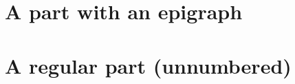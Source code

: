 \documentclass[11pt, a4paper, makeidx]{memoir}
\newcommand{\epipart}[3]{
\let\oldafterpartskip\afterpartskip
\renewcommand{\afterpartskip}{%
\vspace{1em}
\epigraph{#2}{#3}
\vfill
}
\part*{#1}
\let\afterpartskip\oldafterpartskip
}
\begin{document}

\frontmatter


\mainmatter

\pagestyle{companion}



\epipart{A part with an epigraph}{"A fancy quote"}{Some pretentious author}


\part*{A regular part (unnumbered)} 


{\small}

\appendix
\appendixpage*


\backmatter

\end{document}
